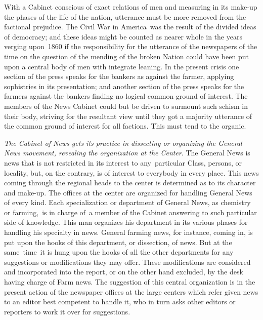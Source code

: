 \documentclass[openany,nobib]{tufte-book}
\begin{document}
With a Cabinet conscious of exact relations of men and measuring in its
make-up the phases of the life of the nation, utterance must be more
removed from the factional prejudice. The Civil War in America~was the
result of the divided ideas of democracy; and these ideas might be
counted as nearer whole in the years verging upon~1860 if the
responsibility for the utterance of the newspapers of the time on the
question of the mending of the broken Nation could have been put upon a
central body of men with integrate leaning. In the present crisis one
section of the press speaks for the bankers as against the farmer,
applying sophistries in its presentation; and another section of the
press speaks for the farmers against the bankers finding no logical
common ground of interest. The members of the News Cabinet could but be
driven to surmount such schism in their body, striving for the resultant
view until they got a majority utterance of the common ground of
interest for all factions. This must tend to the organic.~

\vspace{0.05in}

\emph{The Cabinet of News gets its practice in dissecting or organizing
the General News movement, revealing the organization at the Center}.
The General News is news that is not restricted in its interest to
any~particular Class, persons, or locality, but, on the contrary, is of
interest to everybody in every place. This news coming through the
regional heads to the center is determined as to its character and
make-up. The offices at the center are organized for handling General
News of every kind. Each specialization or department of General News,
as chemistry or farming,~is in charge of~a member of the Cabinet
answering to such particular side of knowledge. This man organizes his
department in its various phases for handling his specialty in news.
General farming news, for instance, coming in, is put upon the hooks of
this department, or dissection, of news. But at the same~time~it is hung
upon the hooks of all the other departments for any suggestions or
modifications they may offer. These modifications are considered and
incorporated into the report, or on the other hand excluded, by the desk
having charge of Farm news. The suggestion of this central organization
is in the present action of the newspaper offices at the large centers
which refer given news to an editor best competent to handle it, who in
turn asks other editors or reporters to work it over for suggestions.~
\end{document}
